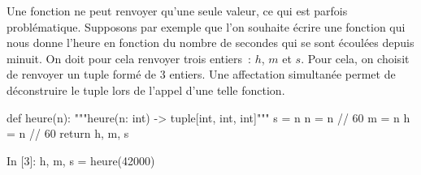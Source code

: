 \documentclass{magnolia}
\begin{document}
Une fonction ne peut renvoyer qu'une seule valeur, ce qui est parfois problématique.
Supposons par exemple que l'on souhaite écrire une fonction qui nous donne l'heure en 
fonction du nombre de secondes qui se sont écoulées depuis minuit. On doit pour cela renvoyer
trois entiers~: $h$, $m$ et $s$. Pour cela, on choisit de renvoyer un tuple
formé de 3 entiers. Une affectation simultanée permet de déconstruire le tuple lors de
l'appel d'une telle fonction.

\begin{pythoncodeline}
def heure(n):
    """heure(n: int) -> tuple[int, int, int]"""
    s = n %
    n = n // 60
    m = n %
    h = n // 60
    return h, m, s  
\end{pythoncodeline}

\begin{pythoncode}
In [3]: h, m, s = heure(42000)
\end{pythoncode}

				







\end{document}
